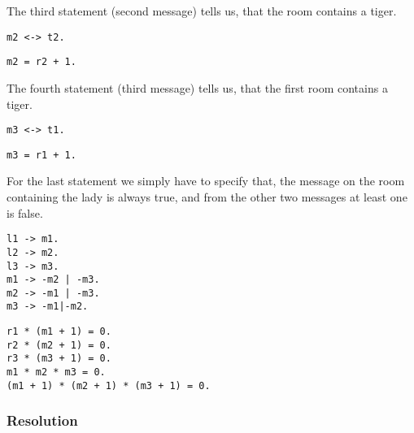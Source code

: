 The third statement (second message) tells us, that the room contains a tiger.

\begin{multicols}{2}

\begin{lstlisting}[numbers=none,title=Propositional logic]
m2 <-> t2.
\end{lstlisting}

\begin{lstlisting}[numbers=none,title=Modular arithmetic]
m2 = r2 + 1.
\end{lstlisting}

\end{multicols}

The fourth statement (third message) tells us, that the first room contains a tiger.

\begin{multicols}{2}

\begin{lstlisting}[numbers=none,title=Propositional logic]
m3 <-> t1.
\end{lstlisting}

\begin{lstlisting}[numbers=none,title=Modular arithmetic]
m3 = r1 + 1.
\end{lstlisting}

\end{multicols}

For the last statement we simply have to specify that, the message on the room containing the lady is always true, and from the other two messages at least one is false.

\begin{multicols}{2}

\begin{lstlisting}[numbers=none,title=Propositional logic]
l1 -> m1.
l2 -> m2.
l3 -> m3.
m1 -> -m2 | -m3.
m2 -> -m1 | -m3.
m3 -> -m1|-m2.
\end{lstlisting}

\begin{lstlisting}[numbers=none,title=Modular arithmetical]
r1 * (m1 + 1) = 0.
r2 * (m2 + 1) = 0.
r3 * (m3 + 1) = 0.
m1 * m2 * m3 = 0.
(m1 + 1) * (m2 + 1) * (m3 + 1) = 0.
\end{lstlisting}

\end{multicols}


\subsubsection{Resolution}


